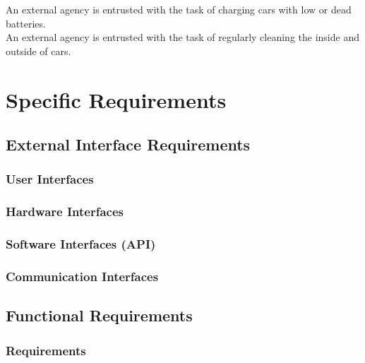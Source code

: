 \documentclass[english]{article}
\begin{document}
An external agency is entrusted with the task of charging cars with low or dead batteries.\\


An external agency is entrusted with the task of regularly cleaning the inside and outside of cars.\\


\newpage

\section{Specific Requirements}

\subsection{External Interface Requirements}

\subsubsection{User Interfaces}

\subsubsection{Hardware Interfaces}

\subsubsection{Software Interfaces (API)}

\subsubsection{Communication Interfaces}

\newpage
\subsection{Functional Requirements}

\subsubsection{Requirements}
\end{document}
